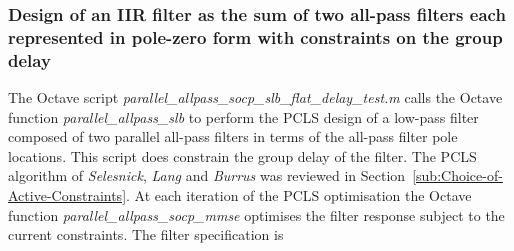 \documentclass[a4paper,twoside,10pt,english]{report}
\begin{document}
\subsubsection{\label{sec:Design-IIR-filter-sum-all-pass-filters-pole-zero-constrained-group-delay}Design of an IIR filter as the sum of two all-pass filters each represented in pole-zero form with constraints on the group delay}
The Octave script \emph{parallel\_allpass\_socp\_slb\_flat\_delay\_test.m} calls 
the Octave function \emph{parallel\_allpass\_slb} to perform the PCLS design of
a low-pass filter composed of two parallel all-pass filters in terms of the 
all-pass filter pole locations. This script does constrain the group delay of 
the filter. The PCLS algorithm of \emph{Selesnick}, \emph{Lang} and 
\emph{Burrus} was reviewed in Section~\ref{sub:Choice-of-Active-Constraints}. At
each iteration of the PCLS optimisation the Octave function 
\emph{parallel\_allpass\_socp\_mmse} optimises the filter response subject to 
the current constraints. The filter specification is
\begin{small}

\end{small}
\end{document}

